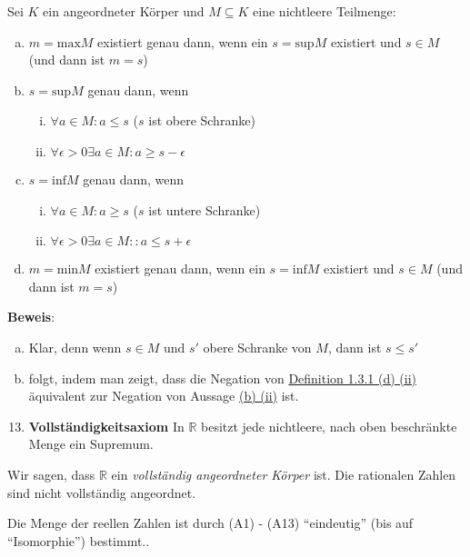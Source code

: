 \documentclass{article}
\begin{document}
Sei $K$ ein angeordneter Körper und $M \subseteq K$ eine nichtleere Teilmenge:
\begin{enumerate}[(a)]
\item $m = \text{max}M$ existiert genau dann, wenn ein $s = \text{sup}M$ existiert und $s \in M$
  (und dann ist $m = s$)
\item $s = \text{sup}M$ genau dann, wenn
  \begin{enumerate}[(i)]
  \item $\forall a \in M \colon a \leq s$ ($s$ ist obere Schranke)
  \item \label{sec:1.3.4_b_ii} $\forall \epsilon > 0 \exists a \in M \colon a \geq s - \epsilon$
  \end{enumerate}
\item $s = \text{inf}M$ genau dann, wenn
  \begin{enumerate}[(i)]
  \item $\forall a \in M \colon a \geq s$ ($s$ ist untere Schranke)
  \item $\forall \epsilon > 0 \exists a \in M \colon: a \leq s + \epsilon$
  \end{enumerate}
\item $m = \text{min}M$ existiert genau dann, wenn ein $s = \text{inf}M$ existiert und $s \in M$
  (und dann ist $m = s$)
\end{enumerate}

\textbf{Beweis}:
\begin{enumerate}[(a)]
\item Klar, denn wenn $s \in M$ und $s'$ obere Schranke von $M$, dann ist $s \leq s'$
\item folgt, indem man zeigt, dass die Negation von \hyperref[sec:1.3.1_d_ii]{Definition 1.3.1 (d) (ii)}
  äquivalent zur Negation von Aussage \hyperref[sec:1.3.4_b_ii]{(b) (ii)} ist.
\end{enumerate}

\begin{enumerate}[label=(A\arabic*)]
\setcounter{enumi}{12}
\item \label{axiom:13} \textbf{Vollständigkeitsaxiom} In $\mathbb{R}$ besitzt jede nichtleere, nach oben beschränkte Menge ein Supremum.
\end{enumerate}

Wir sagen, dass $\mathbb{R}$ ein \emph{vollständig angeordneter Körper} ist. Die rationalen Zahlen sind nicht
vollständig angeordnet.

Die Menge der reellen Zahlen ist durch (A1) - (A13) ``eindeutig'' (bis auf ``Isomorphie'') bestimmt..
\end{document}
